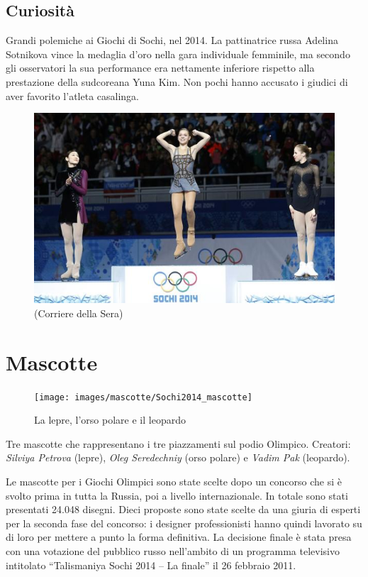 \documentclass[
]{book}
\begin{document}
\subsection*{Curiosità}\label{curiosituxe0-7}

Grandi polemiche ai Giochi di Sochi, nel 2014. La pattinatrice russa Adelina Sotnikova vince la medaglia d'oro nella gara individuale femminile, ma secondo gli osservatori la sua performance era nettamente inferiore rispetto alla prestazione della sudcoreana Yuna Kim. Non pochi hanno accusato i giudici di aver favorito l'atleta casalinga.

\begin{figure}
\includegraphics[width=0.8\linewidth]{images/corriere/2014} \caption{(Corriere della Sera)}\label{fig:unnamed-chunk-88}
\end{figure}

\section*{Mascotte}\label{mascotte-11}

\begin{figure}
\texttt{[image: images/mascotte/Sochi2014\_mascotte]} \caption{La lepre, l'orso polare e il leopardo}\label{fig:unnamed-chunk-89}
\end{figure}

Tre mascotte che rappresentano i tre piazzamenti sul podio Olimpico.
Creatori: \emph{Silviya Petrova} (lepre), \emph{Oleg Seredechniy} (orso polare) e \emph{Vadim Pak} (leopardo).

Le mascotte per i Giochi Olimpici sono state scelte dopo un concorso che si è svolto prima in tutta la Russia, poi a livello internazionale. In totale sono stati presentati 24.048 disegni. Dieci proposte sono state scelte da una giuria di esperti per la seconda fase del concorso: i designer professionisti hanno quindi lavorato su di loro per mettere a punto la forma definitiva. La decisione finale è stata presa con una votazione del pubblico russo nell'ambito di un programma televisivo intitolato ``Talismaniya Sochi 2014 -- La finale'' il 26 febbraio 2011.
\end{document}
